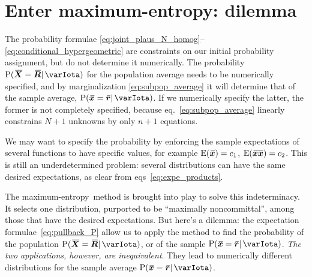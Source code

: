 \documentclass{article}
\theoremstyle{remark}
\theoremstyle{innote}
\renewcommand*{\|}{\mathpunct{|}}%
\newcommand*{\p}{\mathrm{P}}%
\newcommand*{\eqn}{eq.}%
\newcommand*{\eqns}{eqs}%
\newcommand*{\E}{\mathrm{E}}
\DeclarePairedDelimiter\expp{(}{)}
\newcommand*{\expe}{\E\expp}%
\theoremstyle{simple}
\newcommand*{\widebar}[1]{{\mkern1.5mu\skew{2}\overline{\mkern-1.5mu#1\mkern-1.5mu}\mkern 1.5mu}}
\newcommand*{\av}{\widebar} %
\newcommand*{\sav}{\widebar} %
\newcommand*{\yxx}{x}%
\newcommand*{\yx}{\bm{\yxx}}%
\newcommand*{\yxs}{\sav{\yx}}%
\newcommand*{\yX}{\bm{X}}%
\newcommand*{\yXf}{\av{\yX}}%
\newcommand*{\yxxs}{\sav{\yx\yx}}%
\newcommand*{\yr}{\bm{r}}%
\newcommand*{\yrs}{\sav{\yr}}%
\newcommand*{\yR}{\bm{R}}%
\newcommand*{\yRf}{\av{\yR}}%
\newcommand*{\yH}{\varIota}
\newcommand*{\me}{maximum-entropy}
\begin{document}
\section{Enter maximum-entropy: dilemma}
\label{sec:specific_initial_probability}

The probability formulae
\eqref{eq:joint_plaus_N_homog}--\eqref{eq:conditional_hypergeometric} are
constraints on our initial probability assignment, but do not determine it
numerically. The probability $\p(\yXf=\yRf \| \yH)$ for the population
average needs to be numerically specified, and by marginalization
\eqref{eq:subpop_average} it will determine that of the sample average,
$\p(\yxs=\yrs \| \yH)$. If we numerically specify the latter, the former is
not completely specified, because \eqn~\eqref{eq:subpop_average} linearly
constrains $N+1$ unknowns by only $n+1$ equations.

We may want to specify the probability by enforcing the sample expectations
of several functions to have specific values, for example
$\expe{\yxs}=c_1$, $\expe{\yxxs}=c_2$. This is still an underdetermined
problem: several distributions can have the same desired expectations, as
clear from \eqns~\eqref{eq:expe_products}.

The \me\ method is brought into play to solve this indeterminacy. It
selects one distribution, purported to be \enquote{maximally noncommittal},
among those that have the desired expectations. But here's a dilemma: the
expectation formulae~\eqref{eq:pullback_P} allow us to apply the method to
find the probability of the population $\p(\yXf=\yRf \| \yH)$, or of the
sample $\p(\yxs=\yrs \| \yH)$. \emph{The two applications, however, are
  inequivalent}. They lead to numerically different distributions for the
sample average $\p(\yxs=\yrs \| \yH)$.
\end{document}
